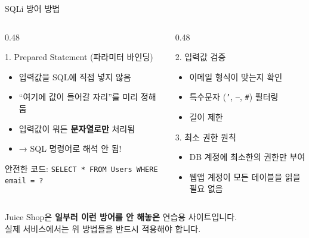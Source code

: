 \documentclass[aspectratio=169,10pt]{beamer}
\newcommand{\hlt}[1]{\textcolor{accent}{\textbf{#1}}}
\begin{document}
\begin{frame}{SQLi 방어 방법}

\begin{columns}[T]
\begin{column}{0.48\textwidth}
\begin{block}{1. Prepared Statement (파라미터 바인딩)}
\begin{itemize}
    \item 입력값을 SQL에 직접 넣지 않음
    \item ``여기에 값이 들어갈 자리''를 미리 정해둠
    \item 입력값이 뭐든 \hlt{문자열로만} 처리됨
    \item → SQL 명령어로 해석 안 됨!
\end{itemize}
\vspace{0.2em}
{\scriptsize 안전한 코드: \texttt{SELECT * FROM Users WHERE email = ?}}
\end{block}
\end{column}
\begin{column}{0.48\textwidth}
\begin{block}{2. 입력값 검증}
\begin{itemize}
    \item 이메일 형식이 맞는지 확인
    \item 특수문자 (\texttt{'}, \texttt{--}, \texttt{\#}) 필터링
    \item 길이 제한
\end{itemize}
\end{block}
\vspace{0.3em}
\begin{block}{3. 최소 권한 원칙}
\begin{itemize}
    \item DB 계정에 최소한의 권한만 부여
    \item 웹앱 계정이 모든 테이블을 읽을 필요 없음
\end{itemize}
\end{block}
\end{column}
\end{columns}

\vspace{0.3em}
{\footnotesize Juice Shop은 \hlt{일부러 이런 방어를 안 해놓은} 연습용 사이트입니다.\\
실제 서비스에서는 위 방법들을 반드시 적용해야 합니다.}
\end{frame}
\end{document}
